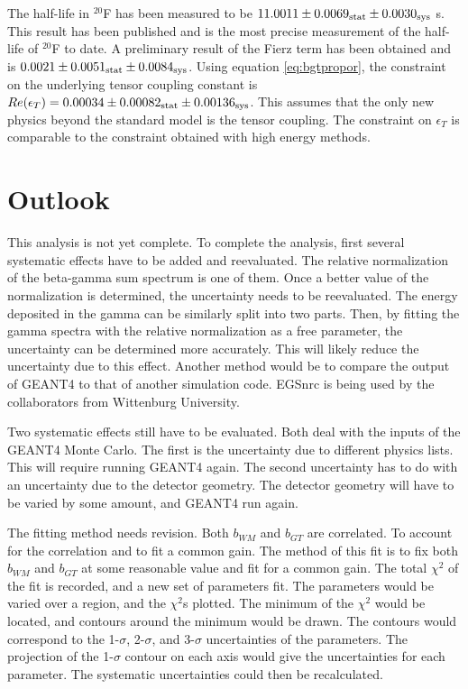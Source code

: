 \documentclass[../MaxHughesThesis.tex]{subfiles}
\begin{document}
The half-life in $^{20}$F has been measured to be  $11.0011 \pm   0.0069_{\rm{stat}}  \pm 0.0030_{\rm{sys}}$ s.
This result has been published and is the most precise measurement of the half-life of $^{20}$F to date.
A preliminary result of the Fierz term has been obtained and is $0.0021 \pm 0.0051_{\rm{stat}} \pm 0.0084_{\rm{sys}}$.
Using equation \ref{eq:bgtpropor}, the constraint on the underlying tensor coupling constant is $Re(\epsilon_{T}) = 0.00034 \pm 0.00082_{\rm{stat}} \pm 0.00136_{\rm{sys}}$.
This assumes that the only new physics beyond the standard model is the tensor coupling. 
The constraint on $\epsilon_{T}$ is comparable to the constraint obtained with high energy methods.

\section{Outlook}
This analysis is not yet complete.
To complete the analysis, first several systematic effects have to be added and reevaluated.
The relative  normalization of the beta-gamma sum spectrum is one of them. 
Once a better value of the normalization is determined, the uncertainty needs to be reevaluated.
The energy deposited in the gamma can be similarly split into two parts.
Then, by fitting the gamma spectra with the relative normalization as a free parameter, the uncertainty can be determined more accurately.
This will likely reduce the uncertainty due to this effect.
Another method would be to compare the output of GEANT4 to that of another simulation code.
EGSnrc is being used by the collaborators from Wittenburg University. 

Two systematic effects still have to be evaluated.
Both deal with the inputs of the GEANT4 Monte Carlo.
The first is the uncertainty due to different physics lists. 
This will require running GEANT4 again.
The second uncertainty has to do with an uncertainty due to the detector geometry.
The detector geometry will have to be varied by some amount, and GEANT4 run again.

The fitting method needs revision.
Both $b_{WM}$ and $b_{GT}$ are correlated.
To account for the correlation and to fit a common gain.
The method of this fit is to fix both $b_{WM}$ and $b_{GT}$ at some reasonable value and fit for a common gain.
The total $\chi^{2}$ of the fit is recorded, and a new set of parameters fit. 
The parameters would be varied over a region, and the $\chi^{2}$s plotted.
The minimum of the $\chi^{2}$ would be located, and contours around the minimum would be drawn. 
The contours would correspond to the 1-$\sigma$, 2-$\sigma$, and 3-$\sigma$ uncertainties of the parameters. 
The projection of the 1-$\sigma$ contour on each axis would give the uncertainties for each parameter.
The systematic uncertainties could then be recalculated.
\end{document}
